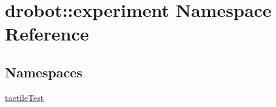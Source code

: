 \hypertarget{namespacedrobot_1_1experiment}{\section{drobot\-:\-:experiment Namespace Reference}
\label{namespacedrobot_1_1experiment}
}
\subsection*{Namespaces}
\begin{DoxyCompactItemize}
\item 
\hyperlink{namespacedrobot_1_1experiment_1_1tactileTest}{tactile\-Test}
\end{DoxyCompactItemize}

